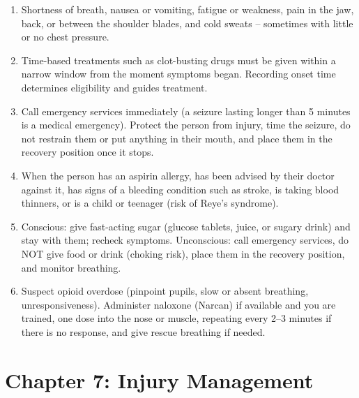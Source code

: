 \begin{enumerate}[leftmargin=*]
\item Shortness of breath, nausea or vomiting, fatigue or weakness, pain in the jaw, back, or between the shoulder blades, and cold sweats -- sometimes with little or no chest pressure.
\item Time-based treatments such as clot-busting drugs must be given within a narrow window from the moment symptoms began. Recording onset time determines eligibility and guides treatment.
\item Call emergency services immediately (a seizure lasting longer than 5 minutes is a medical emergency). Protect the person from injury, time the seizure, do not restrain them or put anything in their mouth, and place them in the recovery position once it stops.
\item When the person has an aspirin allergy, has been advised by their doctor against it, has signs of a bleeding condition such as stroke, is taking blood thinners, or is a child or teenager (risk of Reye's syndrome).
\item Conscious: give fast-acting sugar (glucose tablets, juice, or sugary drink) and stay with them; recheck symptoms. Unconscious: call emergency services, do NOT give food or drink (choking risk), place them in the recovery position, and monitor breathing.
\item Suspect opioid overdose (pinpoint pupils, slow or absent breathing, unresponsiveness). Administer naloxone (Narcan) if available and you are trained, one dose into the nose or muscle, repeating every 2--3 minutes if there is no response, and give rescue breathing if needed.
\end{enumerate}

\section*{Chapter 7: Injury Management}

